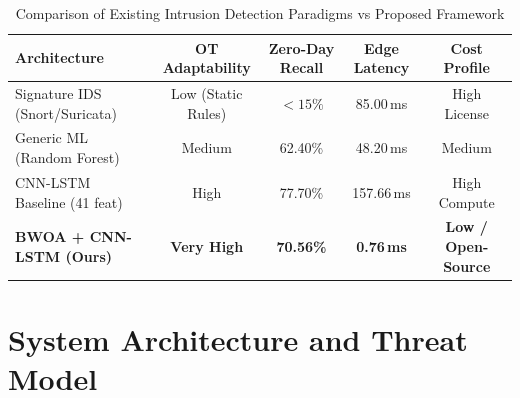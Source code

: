 \documentclass[conference]{IEEEtran}
\begin{document}
\begin{table}[htbp]
\caption{Comparison of Existing Intrusion Detection Paradigms vs Proposed Framework}
\label{tab:comparison}
\centering
\begin{tabularx}{\columnwidth}{Xcccc}
\toprule
\textbf{Architecture} & \textbf{OT Adaptability} & \textbf{Zero-Day Recall} & \textbf{Edge Latency} & \textbf{Cost Profile} \\
\midrule
Signature IDS (Snort/Suricata) \cite{alanazi2022scada} & Low (Static Rules) & $<15\%$ & 85.00\,ms & High License \\
Generic ML (Random Forest) \cite{ahmad2018performance} & Medium & 62.40\% & 48.20\,ms & Medium \\
CNN-LSTM Baseline (41 feat) \cite{almomani2025cyberattack} & High & 77.70\% & 157.66\,ms & High Compute \\
\textbf{BWOA + CNN-LSTM (Ours)} & \textbf{Very High} & \textbf{70.56\%} & \textbf{0.76\,ms} & \textbf{Low / Open-Source} \\
\bottomrule
\end{tabularx}
\end{table}

\section{System Architecture and Threat Model}
\end{document}
